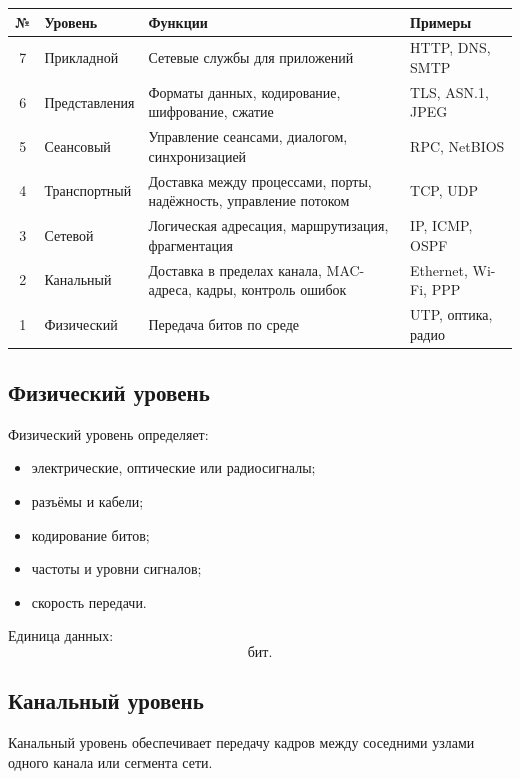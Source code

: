 \documentclass[12pt,a4paper]{article}
\begin{document}
\begin{center}
\begin{tabular}{|c|p{}|p{}|p{}|}
\hline
\textbf{№} & \textbf{Уровень} & \textbf{Функции} & \textbf{Примеры} \\
\hline
7 & Прикладной & Сетевые службы для приложений & HTTP, DNS, SMTP \\
\hline
6 & Представления & Форматы данных, кодирование, шифрование, сжатие & TLS, ASN.1, JPEG \\
\hline
5 & Сеансовый & Управление сеансами, диалогом, синхронизацией & RPC, NetBIOS \\
\hline
4 & Транспортный & Доставка между процессами, порты, надёжность, управление потоком & TCP, UDP \\
\hline
3 & Сетевой & Логическая адресация, маршрутизация, фрагментация & IP, ICMP, OSPF \\
\hline
2 & Канальный & Доставка в пределах канала, MAC-адреса, кадры, контроль ошибок & Ethernet, Wi-Fi, PPP \\
\hline
1 & Физический & Передача битов по среде & UTP, оптика, радио \\
\hline
\end{tabular}
\end{center}

\subsection{Физический уровень}

Физический уровень определяет:
\begin{itemize}
    \item электрические, оптические или радиосигналы;
    \item разъёмы и кабели;
    \item кодирование битов;
    \item частоты и уровни сигналов;
    \item скорость передачи.
\end{itemize}

Единица данных:
\[
\text{бит}.
\]

\subsection{Канальный уровень}

Канальный уровень обеспечивает передачу кадров между соседними узлами одного канала или сегмента сети.
\end{document}
